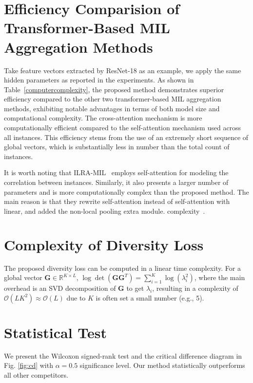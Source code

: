 \section{Efficiency Comparision of Transformer-Based MIL Aggregation Methods}
Take feature vectors extracted by ResNet-18 as an example, we apply the same hidden parameters as reported in the experiments. As shown in Table~\ref{computercomplexity}, the proposed method demonstrates superior efficiency compared to the other two transformer-based MIL aggregation methods, exhibiting notable advantages in terms of both model size and computational complexity. The cross-attention mechanism is more computationally efficient compared to the self-attention mechanism used across all instances. This efficiency stems from the use of an extremely short sequence of global vectors, which is substantially less in number than the total count of instances.

\noindent It is worth noting that ILRA-MIL~\cite{lowrankmil} employs self-attention for modeling the correlation between instances. Similarly, it also presents a larger number of parameters and is more computationally complex than the proposed method. The main reason is that they rewrite self-attention instead of self-attention with linear, and added the non-local pooling extra module. complexity~\cite{wang2020linformer,shen2021efficient,guo2022beyond}.

\section{Complexity of Diversity Loss}
The proposed diversity loss can be computed in a linear time complexity. 
For a global vector $\boldsymbol{G}\in \mathbb{R}^{K \times L}$, $\log\operatorname{det}(\boldsymbol{G}\boldsymbol{G}^T)=\sum_{i=1}^K\log(\lambda_i^2)$, where the main overhead is an SVD decomposition of $\boldsymbol{G}$ to get $\lambda_i$, resulting in a complexity of $\mathcal{O}(LK^2)\approx \mathcal{O}(L) $ due to $K$ is often set a small number (e.g., 5). 


\section{Statistical Test}
 We present the Wilcoxon signed-rank test and the critical difference diagram \cite{demvsar2006statistical} in Fig. \ref{fig:cd} with $\alpha=0.5$ significance level. Our method statistically outperforms all other competitors.


